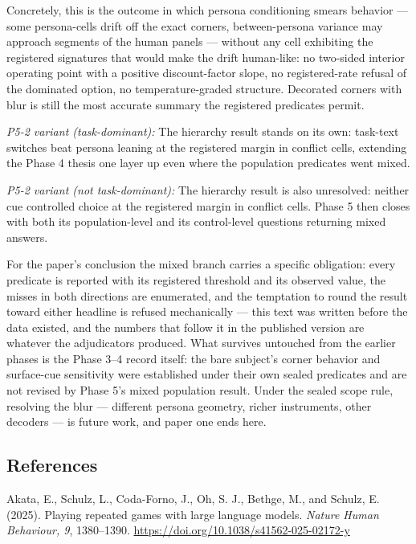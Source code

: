 \documentclass[11pt]{article}
\begin{document}
Concretely, this is the outcome in which persona conditioning smears
behavior --- some persona-cells drift off the exact corners,
between-persona variance may approach segments of the human panels ---
without any cell exhibiting the registered signatures that would make
the drift human-like: no two-sided interior operating point with a
positive discount-factor slope, no registered-rate refusal of the
dominated option, no temperature-graded structure. Decorated corners
with blur is still the most accurate summary the registered predicates
permit.

\emph{P5-2 variant (task-dominant):} The hierarchy result stands on its
own: task-text switches beat persona leaning at the registered margin in
conflict cells, extending the Phase 4 thesis one layer up even where the
population predicates went mixed.

\emph{P5-2 variant (not task-dominant):} The hierarchy result is also
unresolved: neither cue controlled choice at the registered margin in
conflict cells. Phase 5 then closes with both its population-level and
its control-level questions returning mixed answers.

For the paper's conclusion the mixed branch carries a specific
obligation: every predicate is reported with its registered threshold
and its observed value, the misses in both directions are enumerated,
and the temptation to round the result toward either headline is refused
mechanically --- this text was written before the data existed, and the
numbers that follow it in the published version are whatever the
adjudicators produced. What survives untouched from the earlier phases
is the Phase 3--4 record itself: the bare subject's corner behavior and
surface-cue sensitivity were established under their own sealed
predicates and are not revised by Phase 5's mixed population result.
Under the sealed scope rule, resolving the blur --- different persona
geometry, richer instruments, other decoders --- is future work, and
paper one ends here.

\begingroup\small\setlength{\parskip}{3pt}\subsection{References}\label{references}

Akata, E., Schulz, L., Coda-Forno, J., Oh, S. J., Bethge, M., and
Schulz, E. (2025). Playing repeated games with large language models.
\emph{Nature Human Behaviour, 9}, 1380--1390.
\url{https://doi.org/10.1038/s41562-025-02172-y}
\end{document}

